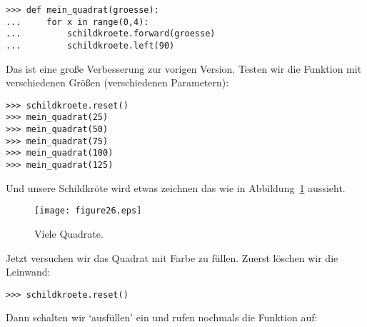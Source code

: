 \begin{Verbatim}[frame=single]
>>> def mein_quadrat(groesse):
...     for x in range(0,4):
...         schildkroete.forward(groesse)
...         schildkroete.left(90)
\end{Verbatim}

Das ist eine große Verbesserung zur vorigen Version. Testen wir die Funktion mit verschiedenen Größen (verschiedenen Parametern):

\begin{Verbatim}[frame=single]
>>> schildkroete.reset()
>>> mein_quadrat(25)
>>> mein_quadrat(50)
>>> mein_quadrat(75)
>>> mein_quadrat(100)
>>> mein_quadrat(125)
\end{Verbatim}

Und unsere Schildkröte wird etwas zeichnen das wie in Abbildung~\ref{fig26} aussieht.

\begin{figure}
\begin{center}
\texttt{[image: figure26.eps]}
\end{center}
\caption{Viele Quadrate.}\label{fig26}
\end{figure}

\noindent
Jetzt versuchen wir das Quadrat mit Farbe zu füllen. Zuerst löschen wir die Leinwand:

\begin{Verbatim}[frame=single]
>>> schildkroete.reset()
\end{Verbatim}

\noindent
Dann schalten wir `ausfüllen' ein und rufen nochmals die Funktion  auf:

